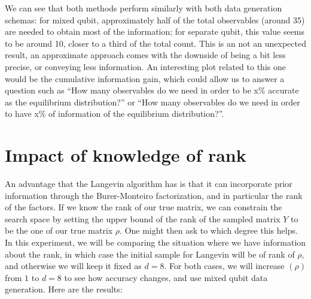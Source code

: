 \documentclass[12pt]{memoir}
\newcommand{\rhorank}[0]{\text{rank}$(\rho) $ }
\begin{document}
We can see that both methods perform similarly with both data generation schemas: for mixed qubit, approximately half of the total observables (around 35) are needed to obtain most of the information; for separate qubit, this value seems to be around 10, closer to a third of the total count. This is an not an unexpected result, an approximate approach comes with the downside of being a bit less precise, or conveying less information. An interesting plot related to this one would be the cumulative information gain, which could allow us to answer a question such as ``How many observables do we need in order to be x\% accurate as the equilibrium distribution?'' or ``How many observables do we need in order to have x\% of information of the equilibrium distribution?''.
\section{Impact of knowledge of rank}\label{section:comp-rank-info}
An advantage that the Langevin algorithm has is that it can incorporate prior information through the Burer-Monteiro factorization, and in particular the rank of the factors. If we know the rank of our true matrix, we can constrain the search space by setting the upper bound of the rank of the sampled matrix $Y$ to be the one of our true matrix $\rho$. One might then ask to which degree this helps. In this experiment, we will be comparing the situation where we have information about the rank, in which case the initial sample for Langevin will be of rank of $\rho$, and otherwise we will keep it fixed as $d=8$. For both cases, we will increase \rhorank from $1$ to $d=8$ to see how accuracy changes, and use mixed qubit data generation. Here are the results:
\end{document}
